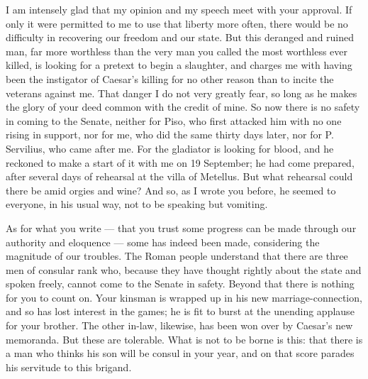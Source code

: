 

 I am intensely glad that my opinion and my speech meet with your approval. If only it were permitted to me to use that liberty more often, there would be no difficulty in recovering our freedom and our state. But this deranged and ruined man, far more worthless than the very man you called the most worthless ever killed, is looking for a pretext to begin a slaughter, and charges me with having been the instigator of Caesar's killing for no other reason than to incite the veterans against me. That danger I do not very greatly fear, so long as he makes the glory of your deed common with the credit of mine. So now there is no safety in coming to the Senate, neither for Piso, who first attacked him with no one rising in support, nor for me, who did the same thirty days later, nor for P. Servilius, who came after me. For the gladiator is looking for blood, and he reckoned to make a start of it with me on 19 September; he had come prepared, after several days of rehearsal at the villa of Metellus. But what rehearsal could there be amid orgies and wine? And so, as I wrote you before, he seemed to everyone, in his usual way, not to be speaking but vomiting.

 As for what you write --- that you trust some progress can be made through our authority and eloquence --- some has indeed been made, considering the magnitude of our troubles. The Roman people understand that there are three men of consular rank who, because they have thought rightly about the state and spoken freely, cannot come to the Senate in safety. Beyond that there is nothing for you to count on. Your kinsman is wrapped up in his new marriage-connection, and so has lost interest in the games; he is fit to burst at the unending applause for your brother. The other in-law, likewise, has been won over by Caesar's new memoranda. But these are tolerable. What is not to be borne is this: that there is a man who thinks his son will be consul in your year, and on that score parades his servitude to this brigand.

